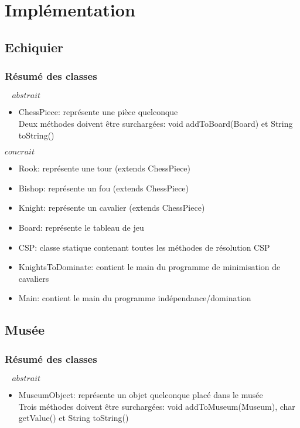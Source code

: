\section{Implémentation}


\subsection{Echiquier}

\subsubsection{Résumé des classes}
$\ \ \ \ abstrait$
\begin{itemize}
    \item ChessPiece: représente une pièce quelconque\\
        Deux méthodes doivent être surchargées: void addToBoard(Board) et String toString()
\end{itemize}


$concrait$
\begin{itemize}
    \item Rook: représente une tour (extends ChessPiece)
    \item Bishop: représente un fou (extends ChessPiece)
    \item Knight: représente un cavalier (extends ChessPiece)
    \item Board: représente le tableau de jeu
    \item CSP: classe statique contenant toutes les méthodes de résolution CSP
    \item KnightsToDominate: contient le main du programme de minimisation de cavaliers
    \item Main: contient le main du programme indépendance/domination
\end{itemize}


\newpage
\subsection{Musée}

\subsubsection{Résumé des classes}
$\ \ \ \ abstrait$
\begin{itemize}
    \item MuseumObject: représente un objet quelconque placé dans le musée\\
        Trois méthodes doivent être surchargées: void addToMuseum(Museum), char getValue() et String toString()
\end{itemize}


